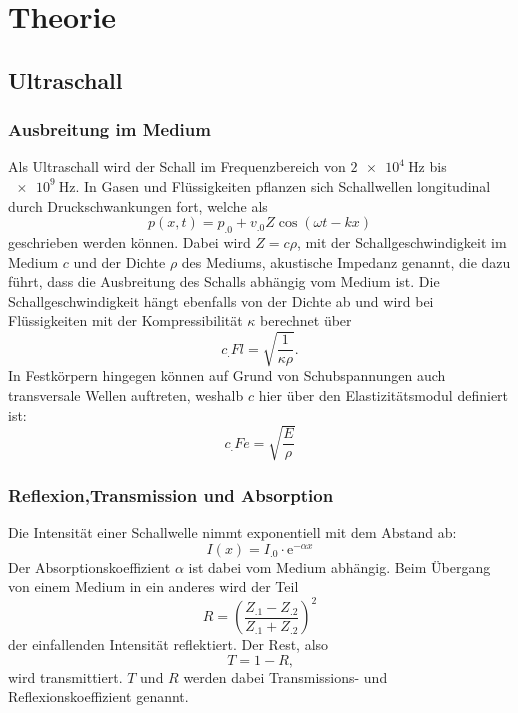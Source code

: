 \section{Theorie}
\label{sec:Theorie}

\subsection{Ultraschall}
\subsubsection{Ausbreitung im Medium}
Als Ultraschall wird der Schall im Frequenzbereich von $\SI{2e4}{\hertz}$ bis $\SI{e9}{\hertz}$.
In Gasen und Flüssigkeiten pflanzen sich Schallwellen longitudinal durch Druckschwankungen fort, welche als 
\[
p(x,t)=p_.0+v_.0 Z \cos(\omega t - kx)
\]
geschrieben werden können. Dabei wird $Z=c\rho$, mit der Schallgeschwindigkeit im Medium $c$ und der Dichte $\rho$ des Mediums, akustische Impedanz genannt, die dazu führt, dass die Ausbreitung des Schalls abhängig vom Medium ist.
Die Schallgeschwindigkeit hängt ebenfalls von der Dichte ab und wird bei Flüssigkeiten mit der Kompressibilität $\kappa$ berechnet über
\begin{equation}
c_.{Fl}=\sqrt{\frac{1}{\kappa\rho}}\label{eq:Fl}\text{.}
\end{equation}
In Festkörpern hingegen können auf Grund von Schubspannungen auch transversale Wellen auftreten, weshalb $c$ hier über den Elastizitätsmodul definiert ist:
\begin{equation}
c_.{Fe}=\sqrt{\frac{E}{\rho}}\label{eq:Fe}
\end{equation}
\subsubsection{Reflexion,Transmission und Absorption}
Die Intensität einer Schallwelle nimmt exponentiell mit dem Abstand ab:
\begin{equation}
I(x)=I_.0\cdot\mathrm{e}^{-\alpha x}\label{eq:I}
\end{equation}
Der Absorptionskoeffizient $\alpha$ ist dabei vom Medium abhängig.
Beim Übergang von einem Medium in ein anderes wird der Teil
\begin{equation}
R=\left(\frac{Z_.1-Z_.2}{Z_.1+Z_.2}\right)^2\label{eq:R}
\end{equation}
der einfallenden Intensität reflektiert. Der Rest, also
\begin{equation}
T=1-R\label{eq:T}\text{,}
\end{equation}
wird transmittiert. $T$ und $R$ werden dabei Transmissions- und Reflexionskoeffizient genannt.

